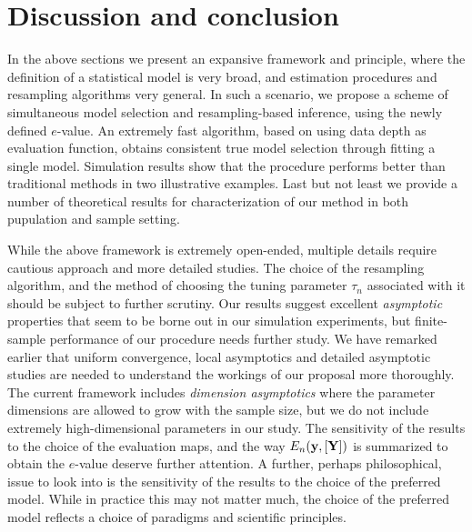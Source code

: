 \section{Discussion and conclusion}
\label{Section:Conclusion}

In the above sections we present an expansive framework and principle, where the definition of a statistical model is very broad, and estimation procedures and resampling algorithms very general. In such a scenario, we propose a scheme of simultaneous model selection and resampling-based inference, using the newly defined $e$-value. An extremely fast algorithm, based on using data depth as evaluation function, obtains consistent true model selection  through fitting a single model. Simulation results show that the procedure performs better than traditional methods in two illustrative examples. Last but not least we provide a number of theoretical results for characterization of our method in both pupulation and sample setting.

While the above framework is extremely open-ended, multiple details require cautious approach and more detailed studies. The choice of the resampling algorithm, and the method of choosing the tuning parameter $\tau_{n}$ associated with it should be subject to further scrutiny. Our results suggest excellent {\textit{asymptotic}} properties that seem to be borne out in our simulation experiments, but finite-sample performance of our procedure needs further study. We have remarked earlier that uniform convergence, local asymptotics and detailed asymptotic studies are needed to understand the workings of our proposal more thoroughly. The current framework includes {\textit{dimension asymptotics}} where the parameter dimensions are allowed to grow with the sample size, but we do not include extremely  high-dimensional parameters in our study. The sensitivity of the results to the choice  of the evaluation maps, and the way $E_{n} ({\bf{y}}, [{\mathbf{Y}}])$ is summarized to obtain the $e$-value deserve further attention. A further, perhaps philosophical, issue to look into is the sensitivity of the results to the choice of the preferred model. While in practice this may not matter much, the choice of the preferred model reflects a choice of paradigms and scientific principles.

